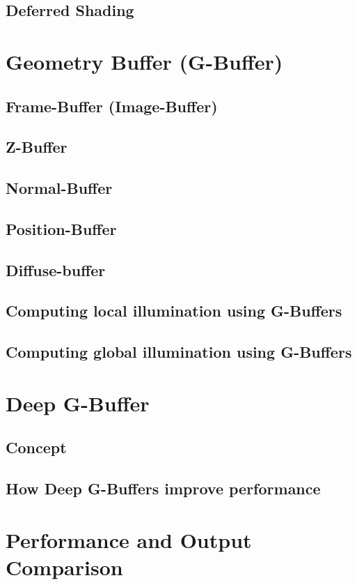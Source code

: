 \documentclass{ACGSeminar}
\begin{document}
	\subsection{Deferred Shading}

\section{Geometry Buffer (G-Buffer)}
	\subsection{Frame-Buffer (Image-Buffer)}
	\subsection{Z-Buffer}
	\subsection{Normal-Buffer}
	\subsection{Position-Buffer}
	\subsection{Diffuse-buffer}
	\subsection{Computing local illumination using G-Buffers}
	\subsection{Computing global illumination using G-Buffers}

\section{Deep G-Buffer}
	\subsection{Concept}
	\subsection{How Deep G-Buffers improve performance}

\section{Performance and Output Comparison}
\end{document}
